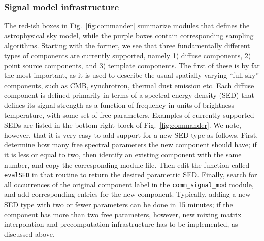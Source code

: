 \documentclass[twocolumn]{aa}
\begin{document}
\subsubsection{Signal model infrastructure}

The red-ish boxes in Fig.~\ref{fig:commander} summarize modules that
defines the astrophysical sky model, while the purple boxes contain
corresponding sampling algorithms. Starting with the former, we see
that three fundamentally different types of components are currently
supported, namely 1) diffuse components, 2) point source components,
and 3) template components. The first of these is by far the most
important, as it is used to describe the usual spatially varying
``full-sky'' components, such as CMB, synchrotron, thermal dust
emission etc. Each diffuse component is defined primarily in terms of
a spectral energy density (SED) that defines its signal strength as a
function of frequency in units of brightness temperature, with some
set of free parameters. Examples of currently supported SEDs
are listed in the bottom right block of Fig.~\ref{fig:commander}. We
note, however, that it is very easy to add support for a new SED type
as follows. First, determine how many free spectral parameters the new
component should have; if it is less or equal to two, then identify an
existing component with the same number, and copy the corresponding
module file. Then edit the function called \texttt{evalSED} in that
routine to return the desired parametric SED. Finally, search for all
occurrences of the original component label in the
\texttt{comm\_signal\_mod} module, and add corresponding entries for
the new component. Typically, adding a new SED type with two or fewer
parameters can be done in 15 minutes; if the component has more than
two free parameters, however, new mixing matrix interpolation and
precomputation infrastructure has to be implemented, as discussed
above.
\end{document}
